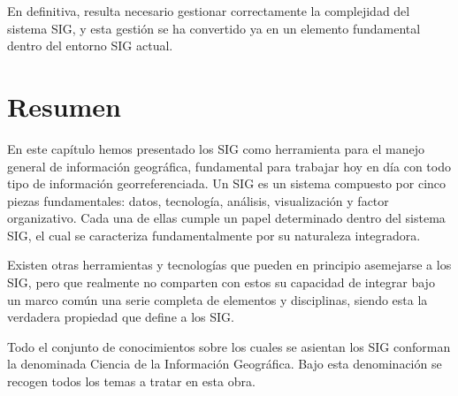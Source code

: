 En definitiva, resulta necesario gestionar correctamente la complejidad del sistema SIG, y esta gestión se ha convertido ya en un elemento fundamental dentro del entorno SIG actual.

\section{Resumen}

En este capítulo hemos presentado los SIG como herramienta para el manejo general de información geográfica, fundamental para trabajar hoy en día con todo tipo de información georreferenciada. Un SIG es un sistema compuesto por cinco piezas fundamentales: datos, tecnología, análisis, visualización y factor organizativo. Cada una de ellas cumple un papel determinado dentro del sistema SIG, el cual se caracteriza fundamentalmente por su naturaleza integradora. 

Existen otras herramientas y tecnologías que pueden en principio asemejarse a los SIG, pero que realmente no comparten con estos su capacidad de integrar bajo un marco común una serie completa de elementos y disciplinas, siendo esta la verdadera propiedad que define a los SIG.

Todo el conjunto de conocimientos sobre los cuales se asientan los SIG conforman la denominada Ciencia de la Información Geográfica. Bajo esta denominación se recogen todos los temas a tratar en esta obra.

\pagestyle{empty}
